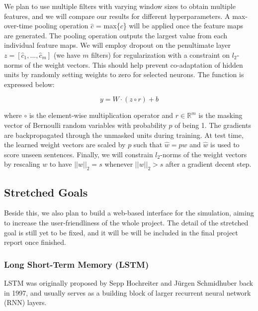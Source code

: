 \documentclass[conference]{IEEEtran}
\begin{document}
    We plan to use multiple filters with varying window sizes to obtain multiple features, and we will
    compare our results for different hyperparameters.
    A max-over-time pooling operation $\hat{c}$ = max\{$c$\} will be applied once the feature
    maps are generated. The pooling operation outputs the largest value from each individual
    feature maps. We will employ dropout on the penultimate layer $z = [\hat{c}_1,...,\hat{c}_m]$
    (we have $m$ filters) for regularization with a constraint on $l_2$-norms of the weight
    vectors. This should help prevent co-adaptation of hidden units by randomly setting weights
    to zero for selected neurons. The function is expressed below:

    \begin{equation}
    y = W \cdot (z \circ r) + b
    \end{equation}

    where $\circ$ is the element-wise multiplication operator and $r \in \mathbb{R}^m$ is
    the masking vector of Bernoulli random variables with probability $p$ of being 1.
    The gradients are backpropagated through the unmasked units during training. At test
    time, the learned weight vectors are scaled by $p$ such that $\hat{w} = pw$ and $\hat{w}$
    is used to score unseen sentences. Finally, we will constrain $l_2$-norms of the weight
    vectors by rescaling $w$ to have $||w||_2 = s$ whenever $||w||_2 > s$ after a gradient
    decent step.

\subsection{Stretched Goals}
\label{model:stretch}
    
    Beside this, we also plan to build a web-based interface for the simulation, aiming
    to increase the user-friendliness of the whole project. The detail of the stretched
    goal is still yet to be fixed, and it will be will be included in the final project
    report once finished.


\subsubsection{Long Short-Term Memory (LSTM)}
\label{model:stretch:lstm}
    LSTM was originally proposed by Sepp Hochreiter and J\"urgen Schmidhuber back in 
    1997\cite{hochreiter1997long}, and usually serves as a building block of larger
    recurrent neural network (RNN) layers.
\end{document}

